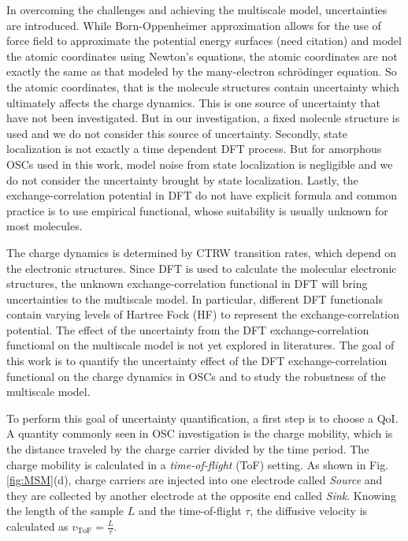 \documentclass[letterpaper,12pt]{article}
\begin{document}
In overcoming the challenges and achieving the multiscale model, uncertainties are introduced. 
While Born-Oppenheimer approximation allows for the use of force field to approximate the potential energy surfaces (need citation) and model the atomic coordinates using Newton’s equations, the atomic coordinates are not exactly the same as that modeled by the many-electron schr\"{o}dinger equation.
So the atomic coordinates, that is the molecule structures contain uncertainty which ultimately affects the charge dynamics. 
This is one source of uncertainty that have not been investigated.
But in our investigation, a fixed molecule structure is used and we do not consider this source of uncertainty. 
Secondly, state localization is not exactly a time dependent DFT process. 
But for amorphous OSCs used in this work, model noise from state localization is negligible and we do not consider the uncertainty brought by state localization.
Lastly, the exchange-correlation potential in DFT do not have explicit formula and common practice is to use empirical functional, whose suitability is usually unknown for most molecules.

The charge dynamics is determined by CTRW transition rates, which depend on the electronic structures.
Since DFT is used to calculate the molecular electronic structures, the unknown exchange-correlation functional in DFT will bring uncertainties to the multiscale model. 
In particular, different DFT functionals contain varying levels of Hartree Fock (HF) to represent the exchange-correlation potential. 
The effect of the uncertainty from the DFT exchange-correlation functional on the multiscale model is not yet explored in literatures. 
The goal of this work is to quantify the uncertainty effect of the DFT exchange-correlation functional on the charge dynamics in OSCs and to study the robustness of the multiscale model. 

To perform this goal of uncertainty quantification, a first step is to choose a QoI. A quantity commonly seen in OSC investigation is the charge mobility, which is the distance traveled by the charge carrier divided by the time period. 
The charge mobility is calculated in a \textit{time-of-flight} (ToF) setting. 
As shown in Fig.\ref{fig:MSM}(d), charge carriers are injected into one electrode called \textit{Source} and they are collected by another electrode at the opposite end called \textit{Sink}. 
Knowing the length of the sample $L$ and the time-of-flight $\tau$, the diffusive velocity is calculated as $v_\text{ToF}=\frac{L}{\tau}$.
\end{document}
